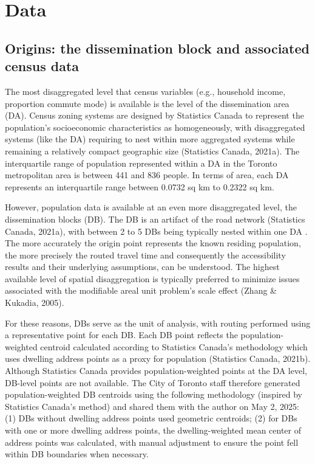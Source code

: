 \documentclass[
11pt, %
oneside, %
english, %
singlespacing, %
]{macthesis} %
\begin{document}
\section{Data}\label{data}

\subsection{Origins: the dissemination block and associated census data}\label{origins-the-dissemination-block-and-associated-census-data}

The most disaggregated level that census variables (e.g., household income, proportion commute mode) is available is the level of the dissemination area (DA). Census zoning systems are designed by Statistics Canada to represent the population's socioeconomic characteristics as homogeneously, with disaggregated systems (like the DA) requiring to nest within more aggregated systems while remaining a relatively compact geographic size (Statistics Canada, 2021a). The interquartile range of population represented within a DA in the Toronto metropolitan area is between 441 and 836 people. In terms of area, each DA represents an interquartile range between 0.0732 sq km to 0.2322 sq km.

However, population data is available at an even more disaggregated level, the dissemination blocks (DB). The DB is an artifact of the road network (Statistics Canada, 2021a), with between 2 to 5 DBs being typically nested within one DA . The more accurately the origin point represents the known residing population, the more precisely the routed travel time and consequently the accessibility results and their underlying assumptions, can be understood. The highest available level of spatial disaggregation is typically preferred to minimize issues associated with the modifiable areal unit problem's scale effect (Zhang \& Kukadia, 2005).

For these reasons, DBs serve as the unit of analysis, with routing performed using a representative point for each DB. Each DB point reflects the population-weighted centroid calculated according to Statistics Canada's methodology which uses dwelling address points as a proxy for population (Statistics Canada, 2021b). Although Statistics Canada provides population-weighted points at the DA level, DB-level points are not available. The City of Toronto staff therefore generated population-weighted DB centroids using the following methodology (inspired by Statistics Canada's method) and shared them with the author on May 2, 2025: (1) DBs without dwelling address points used geometric centroids; (2) for DBs with one or more dwelling address points, the dwelling-weighted mean center of address points was calculated, with manual adjustment to ensure the point fell within DB boundaries when necessary.
\end{document}

